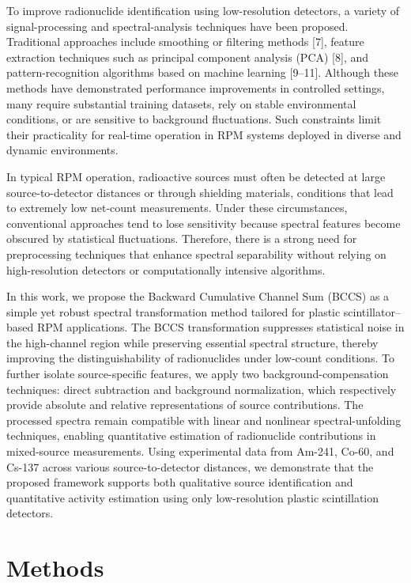 \documentclass[10pt]{wlscirep}
\begin{document}
To improve radionuclide identification using low-resolution detectors, a variety of signal-processing and spectral-analysis techniques have been proposed. Traditional approaches include smoothing or filtering methods [7], feature extraction techniques such as principal component analysis (PCA) [8], and pattern-recognition algorithms based on machine learning [9–11]. Although these methods have demonstrated performance improvements in controlled settings, many require substantial training datasets, rely on stable environmental conditions, or are sensitive to background fluctuations. Such constraints limit their practicality for real-time operation in RPM systems deployed in diverse and dynamic environments.

In typical RPM operation, radioactive sources must often be detected at large source-to-detector distances or through shielding materials, conditions that lead to extremely low net-count measurements. Under these circumstances, conventional approaches tend to lose sensitivity because spectral features become obscured by statistical fluctuations. Therefore, there is a strong need for preprocessing techniques that enhance spectral separability without relying on high-resolution detectors or computationally intensive algorithms.

In this work, we propose the Backward Cumulative Channel Sum (BCCS) as a simple yet robust spectral transformation method tailored for plastic scintillator–based RPM applications. The BCCS transformation suppresses statistical noise in the high-channel region while preserving essential spectral structure, thereby improving the distinguishability of radionuclides under low-count conditions. To further isolate source-specific features, we apply two background-compensation techniques: direct subtraction and background normalization, which respectively provide absolute and relative representations of source contributions.
The processed spectra remain compatible with linear and nonlinear spectral-unfolding techniques, enabling quantitative estimation of radionuclide contributions in mixed-source measurements. Using experimental data from Am-241, Co-60, and Cs-137 across various source-to-detector distances, we demonstrate that the proposed framework supports both qualitative source identification and quantitative activity estimation using only low-resolution plastic scintillation detectors.


\section*{Methods}
\end{document}
